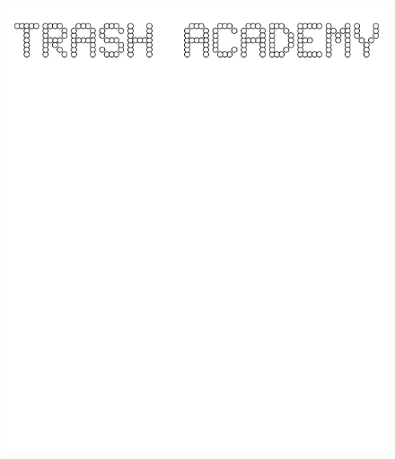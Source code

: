 \documentclass[17pt]{extreport}
\begin{document}
	
	\begin{figure}
		\centering
		\includegraphics[width=6.25in]{imageserver/uploadimages/trashacademy.png}
	\end{figure}
	
\end{document}
